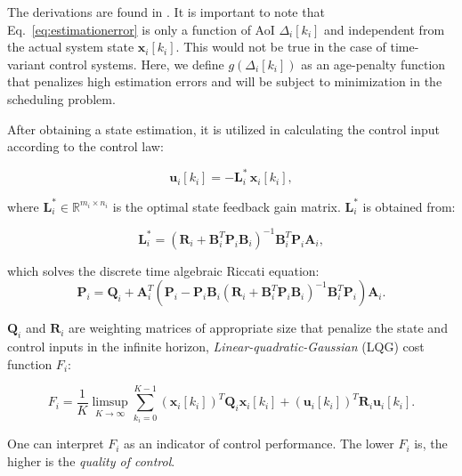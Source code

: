 The derivations are found in \cite{ayan2019age}. It is important to note that
Eq.~\eqref{eq:estimationerror} is only a function of AoI $\Delta_i[k_i]$ and
independent from the actual system state $\boldsymbol{x}_i[k_i]$. This would not
be true in the case of time-variant control systems. Here, we define
$g(\Delta_i[k_i])$ as an age-penalty function that penalizes high estimation
errors and will be subject to minimization in the scheduling problem. 

After obtaining a state estimation, it is utilized in calculating the control
input according to the control law:

\begin{equation}
  \label{eq:controllaw}
  \boldsymbol{u}_i[k_i] = - \boldsymbol{L}_i^* \,\boldsymbol{\hat{x}}_i[k_i],
\end{equation}

where $\boldsymbol{L}_i^* \in \mathbb{R}^{m_i \times n_i}$ is the optimal state
feedback gain matrix. $\boldsymbol{L}^*_i$ is obtained from:

\begin{equation}
  \label{eq:optimalgain}
  \boldsymbol{L}_i^* = \left(\boldsymbol{R}_i + \boldsymbol{B}_i^T \boldsymbol{P}_i \boldsymbol{B}_i \right)^{-1} \boldsymbol{B}_i^T \boldsymbol{P}_i \boldsymbol{A}_i,
\end{equation}

which solves the discrete time algebraic Riccati equation:
\begin{equation}
  \label{eq:riccati}
  \boldsymbol{P}_i = \boldsymbol{Q}_{i} + \boldsymbol{A}_i^T \left(\boldsymbol{P}_i - \boldsymbol{P}_i \boldsymbol{B}_i ( \boldsymbol{R}_{i} + \boldsymbol{B}_i^T \boldsymbol{P}_i \boldsymbol{B}_i)^{- 1} \boldsymbol{B}_i^T \boldsymbol{P}_i \right) \boldsymbol{A}_i.
\end{equation}

$\boldsymbol{Q}_{i}$ and $\boldsymbol{R}_{i}$ are weighting matrices of
appropriate size that penalize the state and control inputs in the infinite
horizon, \textit{Linear-quadratic-Gaussian} (LQG) cost function $F_i$:

\begin{equation}
  F_i = \dfrac{1}{K} \limsup_{K \rightarrow \infty} \sum_{k_i=0}^{K-1} (\boldsymbol{x}_i[k_i])^T \boldsymbol{Q}_i \boldsymbol{x}_i[k_i] +  (\boldsymbol{u}_i[k_i])^T \boldsymbol{R}_i \boldsymbol{u}_i[k_i]. 
\end{equation}

One can interpret $F_i$ as an indicator of control performance. The lower $F_i$
is, the higher is the \textit{quality of control}.


